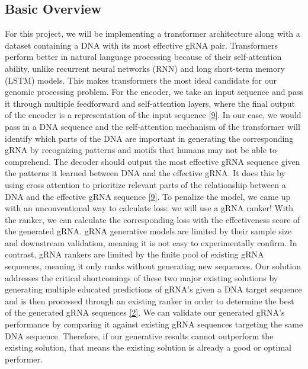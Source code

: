 \documentclass{article}
\begin{document}
\subsection{Basic Overview}
For this project, we will be implementing a transformer architecture along with a dataset containing a DNA with its most effective gRNA pair. Transformers perform better in natural language processing because of their self-attention ability, unlike recurrent neural networks (RNN) and long short-term memory (LSTM) models. This makes transformers the most ideal candidate for our genomic processing problem. For the encoder, we take an input sequence and pass it through multiple feedforward and self-attention layers, where the final output of the encoder is a representation of the input sequence \hyperref[Reference 9]{[9]}. In our case, we would pass in a DNA sequence and the self-attention mechanism of the transformer will identify which parts of the DNA are important in generating the corresponding gRNA by recognizing patterns and motifs that humans may not be able to comprehend. The decoder should output the most effective gRNA sequence given the patterns it learned between DNA and the effective gRNA. It does this by using cross attention to prioritize relevant parts of the relationship between a DNA and the effective gRNA sequence \hyperref[Reference 9]{[9]}. To penalize the model, we came up with an unconventional way to calculate loss: we will use a gRNA ranker! With the ranker, we can calculate the corresponding loss with the effectiveness score of the generated gRNA. gRNA generative models are limited by their sample size and downstream validation, meaning it is not easy to experimentally confirm. In contrast, gRNA rankers are limited by the finite pool of existing gRNA sequences, meaning it only ranks without generating new sequences. Our solution addresses the critical shortcomings of these two major existing solutions by generating multiple educated predictions of gRNA's given a DNA target sequence and is then processed through an existing ranker in order to determine the best of the generated gRNA sequences \hyperref[Reference 2]{[2]}. We can validate our generated gRNA's performance by comparing it against existing gRNA sequences targeting the same DNA sequence. Therefore, if our generative results cannot outperform the existing solution, that means the existing solution is already a good or optimal performer.
\end{document}
